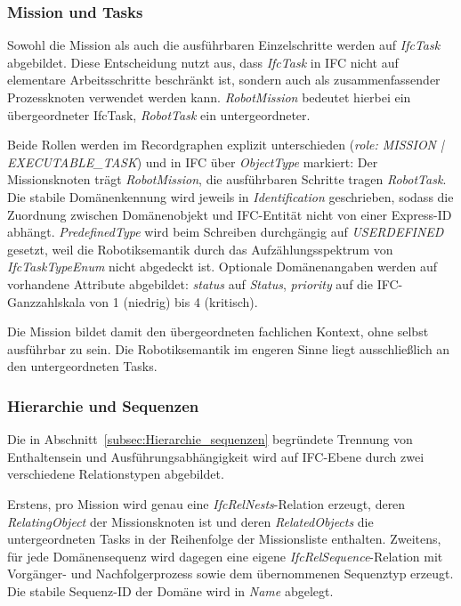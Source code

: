 \subsubsection{Mission und Tasks}
Sowohl die Mission als auch die ausführbaren Einzelschritte werden auf \textit{IfcTask} abgebildet.
Diese Entscheidung nutzt aus, dass \textit{IfcTask} in IFC nicht auf elementare Arbeitsschritte
beschränkt ist, sondern auch als zusammenfassender Prozessknoten verwendet werden kann.
\textit{RobotMission} bedeutet hierbei ein übergeordneter IfcTask, \textit{RobotTask} ein untergeordneter.

Beide Rollen werden im Recordgraphen explizit unterschieden (\textit{role: \dq{}MISSION\dq{} |
\dq{}EXECUTABLE\_TASK\dq{}}) und in IFC über \textit{ObjectType} markiert: Der Missionsknoten trägt
\textit{RobotMission}, die ausführbaren Schritte tragen \textit{RobotTask}. Die stabile
Domänenkennung wird jeweils in \textit{Identification} geschrieben, sodass die Zuordnung zwischen
Domänenobjekt und IFC-Entität nicht von einer Express-ID abhängt. \textit{PredefinedType} wird beim
Schreiben durchgängig auf \textit{USERDEFINED} gesetzt, weil die Robotiksemantik durch das
Aufzählungsspektrum von \textit{IfcTaskTypeEnum} nicht abgedeckt ist. Optionale Domänenangaben
werden auf vorhandene Attribute abgebildet: \textit{status} auf \textit{Status}, \textit{priority}
auf die IFC-Ganzzahlskala von 1 (niedrig) bis 4 (kritisch).

Die Mission bildet damit den übergeordneten fachlichen Kontext, ohne selbst ausführbar zu sein. Die Robotiksemantik im engeren Sinne liegt ausschließlich an den untergeordneten Tasks.

\subsubsection{Hierarchie und Sequenzen}

Die in Abschnitt~\ref{subsec:Hierarchie_sequenzen} begründete Trennung von Enthaltensein und
Ausführungsabhängigkeit wird auf IFC-Ebene durch zwei verschiedene Relationstypen abgebildet.

Erstens, pro Mission wird genau eine \textit{IfcRelNests}-Relation erzeugt, deren
\textit{RelatingObject} der Missionsknoten ist und deren \textit{RelatedObjects} die untergeordneten
Tasks in der Reihenfolge der Missionsliste enthalten.
Zweitens, für jede Domänensequenz wird dagegen eine eigene \textit{IfcRelSequence}-Relation mit
Vorgänger- und Nachfolgerprozess sowie dem übernommenen Sequenztyp erzeugt. Die stabile Sequenz-ID
der Domäne wird in \textit{Name} abgelegt.

